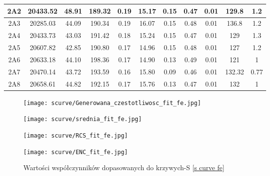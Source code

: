 \begin{table}
\begin{adjustbox}{width=1.1\linewidth,center}
\begin{tabular}{|c|c|c|c|c|c|c|c|c|c|c|}
                2A2&20433.52&48.91&189.32&0.19&15.17&0.15&0.47&0.01&129.8&1.2  \\ \hline 
                2A3&20285.03&44.09&190.34&0.19&16.07&0.15&0.48&0.01&136.8&1.2  \\ \hline 
                2A4&20433.73&43.03&191.42&0.18&15.24&0.15&0.47&0.01&129&1.3  \\ \hline 
                2A5&20607.82&42.85&190.80&0.17&14.96&0.15&0.48&0.01&127&1.2  \\ \hline 
                2A6&20633.18&44.10&198.36&0.17&14.90&0.13&0.49&0.01&121&1  \\ \hline 
                2A7&20470.14&43.72&193.59&0.16&15.80&0.09&0.46&0.01&132.32&0.77  \\ \hline 
                2A8&20658.61&44.82&192.15&0.17&15.76&0.13&0.47&0.01&132&1  \\ \hline 
                \end{tabular}
        \end{adjustbox}

\end{table}

\begin{figure}
        \begin{multicols}{2}
                \texttt{[image: scurve/Generowana\_czestotliwosc\_fit\_fe.jpg]} \par
                \texttt{[image: scurve/srednia\_fit\_fe.jpg]} \par       
        \end{multicols} \hfill
        \begin{multicols}{2}
                \texttt{[image: scurve/RCS\_fit\_fe.jpg]} \par
                \texttt{[image: scurve/ENC\_fit\_fe.jpg]} \par
        \end{multicols}
        \caption{Wartości współczynników dopasowanych do krzywych-S \ref{s curve fe}}
        \label{wyk wsp fe}
\end{figure}